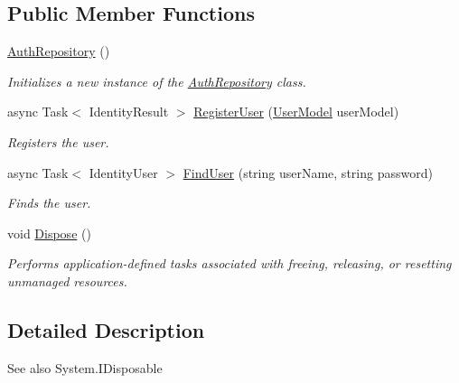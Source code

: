 \subsection*{Public Member Functions}
\begin{DoxyCompactItemize}
\item 
\hyperlink{class_open_1_1_g_i_1_1hypermart_1_1_helpers_1_1_auth_repository_a45b19c0a6f979f86ae43cbded49aeb5a}{Auth\+Repository} ()
\begin{DoxyCompactList}\small\item\em Initializes a new instance of the \hyperlink{class_open_1_1_g_i_1_1hypermart_1_1_helpers_1_1_auth_repository}{Auth\+Repository} class. \end{DoxyCompactList}\item 
async Task$<$ Identity\+Result $>$ \hyperlink{class_open_1_1_g_i_1_1hypermart_1_1_helpers_1_1_auth_repository_aedc26a57af08ecb4a9cae4ab46055bf9}{Register\+User} (\hyperlink{class_open_1_1_g_i_1_1hypermart_1_1_models_1_1_user_model}{User\+Model} user\+Model)
\begin{DoxyCompactList}\small\item\em Registers the user. \end{DoxyCompactList}\item 
async Task$<$ Identity\+User $>$ \hyperlink{class_open_1_1_g_i_1_1hypermart_1_1_helpers_1_1_auth_repository_afe19f379cb79c18b95ae18be218960a6}{Find\+User} (string user\+Name, string password)
\begin{DoxyCompactList}\small\item\em Finds the user. \end{DoxyCompactList}\item 
void \hyperlink{class_open_1_1_g_i_1_1hypermart_1_1_helpers_1_1_auth_repository_afd0cd6f5615edaecc5395a7d60c769a6}{Dispose} ()
\begin{DoxyCompactList}\small\item\em Performs application-\/defined tasks associated with freeing, releasing, or resetting unmanaged resources. \end{DoxyCompactList}\end{DoxyCompactItemize}


\subsection{Detailed Description}


\begin{DoxySeeAlso}{See also}
System.\+I\+Disposable


\end{DoxySeeAlso}



